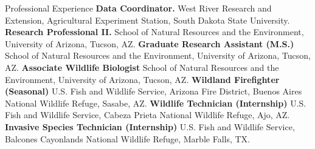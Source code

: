 \begin{rubric}{Professional Experience}
\entry*[7/2024 -- Present]%
    \textbf{Data Coordinator.} West River Research and Extension, Agricultural Experiment Station, South Dakota State University.
\entry*[8/2018 -- 7/2024]%
	\textbf{Research Professional II.} School of Natural Resources and the Environment, University of Arizona, Tucson, AZ.
%
\entry*[7/2016 -- 5/2018]%
	\textbf{Graduate Research Assistant (M.S.)} School of Natural Resources and the Environment, University of Arizona, Tucson, AZ.
%
\entry*[3/2016 -- 7/2016]%
    \textbf{Associate Wildlife Biologist} School of Natural Resources and the Environment, University of Arizona, Tucson, AZ.
%
\entry*[4/2015 -- 10/2015]%
    \textbf{Wildland Firefighter (Seasonal)} U.S. Fish and Wildlife Service, Arizona Fire District, Buenos Aires National Wildlife Refuge, Sasabe, AZ.
%
\entry*[9/2013 -- 5/2015]
    \textbf{Wildlife Technician (Internship)} U.S. Fish and Wildlife Service, Cabeza Prieta National Wildlife Refuge, Ajo, AZ.
%
\entry*[5/2013 -- 9/2013]
    \textbf{Invasive Species Technician (Internship)} U.S. Fish and Wildlife Service, Balcones Cayonlands National Wildlife Refuge, Marble Falls, TX.
\end{rubric}